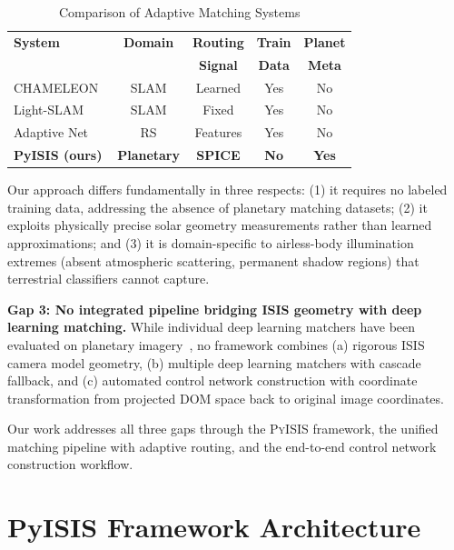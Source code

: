 \documentclass[lettersize,journal]{IEEEtran}
\newcommand{\pyisis}{\textsc{PyISIS}}
\begin{document}
\begin{table}[htbp]
\caption{Comparison of Adaptive Matching Systems}
\label{tab:adaptive_comparison}
\centering
\small
\begin{tabular}{@{}lcccc@{}}
\toprule
\textbf{System} & \textbf{Domain} & \textbf{Routing} & \textbf{Train} & \textbf{Planet} \\
 &  & \textbf{Signal} & \textbf{Data} & \textbf{Meta} \\
\midrule
CHAMELEON~\cite{syed2026chameleon} & SLAM & Learned & Yes & No \\
Light-SLAM~\cite{lightslam2024} & SLAM & Fixed & Yes & No \\
Adaptive Net~\cite{adaptive2023} & RS & Features & Yes & No \\
\textbf{PyISIS (ours)} & \textbf{Planetary} & \textbf{SPICE} & \textbf{No} & \textbf{Yes} \\
\bottomrule
\end{tabular}
\end{table}

Our approach differs fundamentally in three respects: (1) it requires no labeled training data, addressing the absence of planetary matching datasets; (2) it exploits physically precise solar geometry measurements rather than learned approximations; and (3) it is domain-specific to airless-body illumination extremes (absent atmospheric scattering, permanent shadow regions) that terrestrial classifiers cannot capture.

\textbf{Gap 3: No integrated pipeline bridging ISIS geometry with deep learning matching.} While individual deep learning matchers have been evaluated on planetary imagery~\cite{ye2024planetary,yutu2_2024}, no framework combines (a) rigorous ISIS camera model geometry, (b) multiple deep learning matchers with cascade fallback, and (c) automated control network construction with coordinate transformation from projected DOM space back to original image coordinates.

Our work addresses all three gaps through the \pyisis{} framework, the unified matching pipeline with adaptive routing, and the end-to-end control network construction workflow.


\section{PyISIS Framework Architecture}\label{sec:framework}
\end{document}
